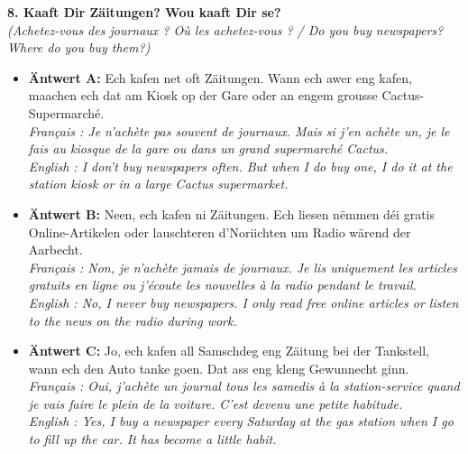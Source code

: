 \noindent\textbf{8. Kaaft Dir Zäitungen? Wou kaaft Dir se?}\\
\textit{(Achetez-vous des journaux ? Où les achetez-vous ? / Do you buy newspapers? Where do you buy them?)}
\begin{itemize}
    \item \textbf{Äntwert A:} Ech kafen net oft Zäitungen. Wann ech awer eng kafen, maachen ech dat am Kiosk op der Gare oder an engem grousse Cactus-Supermarché.\\
    \textit{Français : Je n'achète pas souvent de journaux. Mais si j'en achète un, je le fais au kiosque de la gare ou dans un grand supermarché Cactus.}\\
    \textit{English : I don't buy newspapers often. But when I do buy one, I do it at the station kiosk or in a large Cactus supermarket.}
    \item \textbf{Äntwert B:} Neen, ech kafen ni Zäitungen. Ech liesen nëmmen déi gratis Online-Artikelen oder lauschteren d'Noriichten um Radio wärend der Aarbecht.\\
    \textit{Français : Non, je n'achète jamais de journaux. Je lis uniquement les articles gratuits en ligne ou j'écoute les nouvelles à la radio pendant le travail.}\\
    \textit{English : No, I never buy newspapers. I only read free online articles or listen to the news on the radio during work.}
    \item \textbf{Äntwert C:} Jo, ech kafen all Samschdeg eng Zäitung bei der Tankstell, wann ech den Auto tanke goen. Dat ass eng kleng Gewunnecht ginn.\\
    \textit{Français : Oui, j'achète un journal tous les samedis à la station-service quand je vais faire le plein de la voiture. C'est devenu une petite habitude.}\\
    \textit{English : Yes, I buy a newspaper every Saturday at the gas station when I go to fill up the car. It has become a little habit.}
\end{itemize}
\vspace{0.5em}

